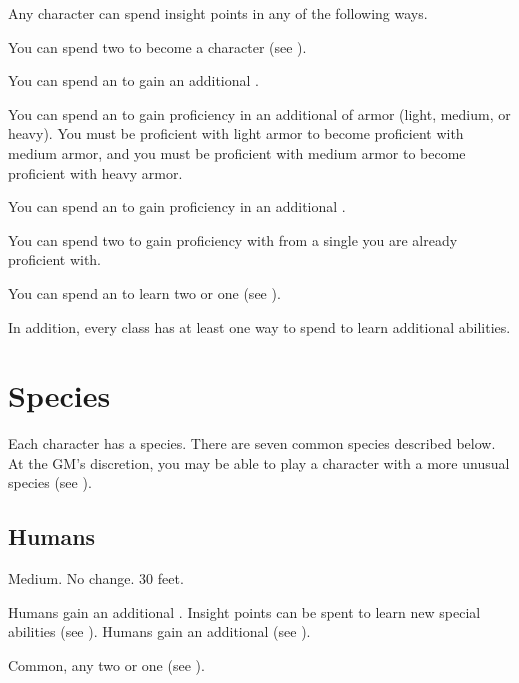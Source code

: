     Any character can spend insight points in any of the following ways.
    \begin{raggeditemize}
        \item You can spend two  to become a  character (see ).
        \item You can spend an  to gain an additional .
        \item You can spend an  to gain proficiency in an additional  of armor (light, medium, or heavy).
            You must be proficient with light armor to become proficient with medium armor, and you must be proficient with medium armor to become proficient with heavy armor.
        \item You can spend an  to gain proficiency in an additional .
        \item You can spend two  to gain proficiency with  from a single  you are already proficient with.
        \item You can spend an  to learn two  or one  (see ).
    \end{raggeditemize}
    In addition, every class has at least one way to spend  to learn additional abilities.

\section{Species}\label{Species}
    Each character has a species.
    There are seven common species described below.
    At the GM's discretion, you may be able to play a character with a more unusual species (see ).

    \subsection{Humans}
         Medium.
         No change.
         30 feet.
        \begin{raggeditemize}
             Humans gain an additional .
                Insight points can be spent to learn new special abilities (see ).
             Humans gain an additional  (see ).
        \end{raggeditemize}
         Common, any two  or one  (see ).

